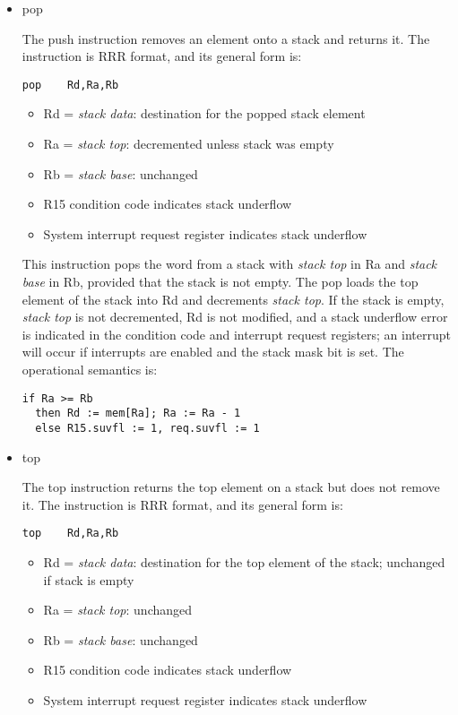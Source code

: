 \documentclass[11pt]{article}
\begin{document}
\begin{itemize}
\item pop
\label{sec:orgd5c69f8}

The push instruction removes an element onto a stack and returns it.
The instruction is RRR format, and its general form is:

\begin{verbatim}
pop    Rd,Ra,Rb
\end{verbatim}

\begin{itemize}
\item Rd = \emph{stack data}: destination for the popped stack element
\item Ra = \emph{stack top}: decremented unless stack was empty
\item Rb = \emph{stack base}: unchanged
\item R15 condition code indicates stack underflow
\item System interrupt request register indicates stack underflow
\end{itemize}

This instruction pops the word from a stack with \emph{stack top} in Ra and
\emph{stack base} in Rb, provided that the stack is not empty.  The pop
loads the top element of the stack into Rd and decrements \emph{stack top}.
If the stack is empty, \emph{stack top} is not decremented, Rd is not
modified, and a stack underflow error is indicated in the condition
code and interrupt request registers; an interrupt will occur if
interrupts are enabled and the stack mask bit is set.  The operational
semantics is:

\begin{verbatim}
if Ra >= Rb
  then Rd := mem[Ra]; Ra := Ra - 1
  else R15.suvfl := 1, req.suvfl := 1
\end{verbatim}

\item top
\label{sec:org3ce3bd6}

The top instruction returns the top element on a stack but does not
remove it.  The instruction is RRR format, and its general form is:

\begin{verbatim}
top    Rd,Ra,Rb
\end{verbatim}

\begin{itemize}
\item Rd = \emph{stack data}: destination for the top element of the stack;
unchanged if stack is empty
\item Ra = \emph{stack top}: unchanged
\item Rb = \emph{stack base}: unchanged
\item R15 condition code indicates stack underflow
\item System interrupt request register indicates stack underflow
\end{itemize}


\end{itemize}
\end{document}
